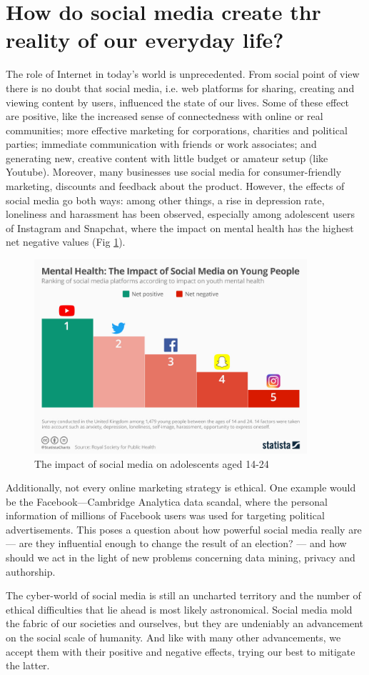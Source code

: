 \documentclass[12pt]{article}
\begin{document}
\section{How do social media create thr reality of our everyday life?}
The role of Internet in today's world is unprecedented. From social point of view there is no doubt that social media, i.e. web platforms for sharing, creating and viewing content by users, influenced the state of our lives. Some of these effect are positive, like the increased sense of connectedness with online or real communities; more effective marketing for corporations, charities and political parties; immediate communication with friends or work associates; and generating new, creative content with little budget or amateur setup (like Youtube). Moreover, many businesses use social media for consumer-friendly marketing, discounts and feedback about the product. However, the effects of social media go both ways: among other things, a rise in depression rate, loneliness and harassment has been observed, especially among adolescent users of Instagram and Snapchat, where the impact on mental health has the highest net negative values (Fig \ref{socmedChart}).

\begin{figure}[htp]
    \centering
    \includegraphics[width=0.9\textwidth]{socmed.jpeg}
    \caption{The impact of social media on adolescents aged 14-24\cite{socmed}}
    \label{socmedChart}
\end{figure}

Additionally, not every online marketing strategy is ethical. One example would be the Facebook---Cambridge Analytica data scandal, where the personal information of millions of Facebook users was used for targeting political advertisements. This poses a question about how powerful social media really are --- are they influential enough to change the result of an election? --- and how should we act in the light of new problems concerning data mining, privacy and authorship. \par
The cyber-world of social media is still an uncharted territory and the number of ethical difficulties that lie ahead is most likely astronomical. Social media mold the fabric of our societies and ourselves, but they are undeniably an advancement on the social scale of humanity. And like with many other advancements, we accept them with their positive and negative effects, trying our best to mitigate the latter.
\end{document}
